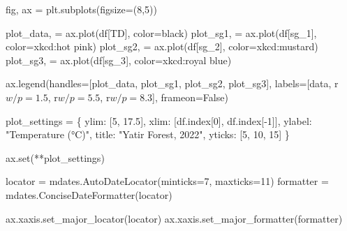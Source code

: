 \documentclass[
  letterpaper,
  DIV=11,
  numbers=noendperiod,
  oneside]{scrreprt}
\newenvironment{Shaded}{\begin{snugshade}}{\end{snugshade}}
\newcommand{\BuiltInTok}[1]{\textcolor[rgb]{0.00,0.23,0.31}{#1}}
\newcommand{\DecValTok}[1]{\textcolor[rgb]{0.68,0.00,0.00}{#1}}
\newcommand{\FloatTok}[1]{\textcolor[rgb]{0.68,0.00,0.00}{#1}}
\newcommand{\NormalTok}[1]{\textcolor[rgb]{0.00,0.23,0.31}{#1}}
\newcommand{\OperatorTok}[1]{\textcolor[rgb]{0.37,0.37,0.37}{#1}}
\newcommand{\StringTok}[1]{\textcolor[rgb]{0.13,0.47,0.30}{#1}}
\newcommand{\VariableTok}[1]{\textcolor[rgb]{0.07,0.07,0.07}{#1}}
\newcommand{\VerbatimStringTok}[1]{\textcolor[rgb]{0.13,0.47,0.30}{#1}}
\begin{document}
\begin{Shaded}
\begin{Highlighting}[]
\NormalTok{fig, ax }\OperatorTok{=}\NormalTok{ plt.subplots(figsize}\OperatorTok{=}\NormalTok{(}\DecValTok{8}\NormalTok{,}\DecValTok{5}\NormalTok{))}

\NormalTok{plot\_data, }\OperatorTok{=}\NormalTok{ ax.plot(df[}\StringTok{\textquotesingle{}TD\textquotesingle{}}\NormalTok{], color}\OperatorTok{=}\StringTok{\textquotesingle{}black\textquotesingle{}}\NormalTok{)}
\NormalTok{plot\_sg1, }\OperatorTok{=}\NormalTok{ ax.plot(df[}\StringTok{\textquotesingle{}sg\_1\textquotesingle{}}\NormalTok{], color}\OperatorTok{=}\StringTok{\textquotesingle{}xkcd:hot pink\textquotesingle{}}\NormalTok{)}
\NormalTok{plot\_sg2, }\OperatorTok{=}\NormalTok{ ax.plot(df[}\StringTok{\textquotesingle{}sg\_2\textquotesingle{}}\NormalTok{], color}\OperatorTok{=}\StringTok{\textquotesingle{}xkcd:mustard\textquotesingle{}}\NormalTok{)}
\NormalTok{plot\_sg3, }\OperatorTok{=}\NormalTok{ ax.plot(df[}\StringTok{\textquotesingle{}sg\_3\textquotesingle{}}\NormalTok{], color}\OperatorTok{=}\StringTok{\textquotesingle{}xkcd:royal blue\textquotesingle{}}\NormalTok{)}

\NormalTok{ax.legend(handles}\OperatorTok{=}\NormalTok{[plot\_data, plot\_sg1, plot\_sg2, plot\_sg3],}
\NormalTok{          labels}\OperatorTok{=}\NormalTok{[}\StringTok{\textquotesingle{}data\textquotesingle{}}\NormalTok{, }\VerbatimStringTok{r\textquotesingle{}$w/p=1.5$\textquotesingle{}}\NormalTok{, }\VerbatimStringTok{r\textquotesingle{}$w/p=5.5$\textquotesingle{}}\NormalTok{, }\VerbatimStringTok{r\textquotesingle{}$w/p=8.3$\textquotesingle{}}\NormalTok{],}
\NormalTok{          frameon}\OperatorTok{=}\VariableTok{False}\NormalTok{)}

\NormalTok{plot\_settings }\OperatorTok{=}\NormalTok{ \{}
    \StringTok{\textquotesingle{}ylim\textquotesingle{}}\NormalTok{: [}\DecValTok{5}\NormalTok{, }\FloatTok{17.5}\NormalTok{],}
    \StringTok{\textquotesingle{}xlim\textquotesingle{}}\NormalTok{: [df.index[}\DecValTok{0}\NormalTok{], df.index[}\OperatorTok{{-}}\DecValTok{1}\NormalTok{]],}
    \StringTok{\textquotesingle{}ylabel\textquotesingle{}}\NormalTok{: }\StringTok{"Temperature (°C)"}\NormalTok{,}
    \StringTok{\textquotesingle{}title\textquotesingle{}}\NormalTok{: }\StringTok{"Yatir Forest, 2022"}\NormalTok{,}
    \StringTok{\textquotesingle{}yticks\textquotesingle{}}\NormalTok{: [}\DecValTok{5}\NormalTok{, }\DecValTok{10}\NormalTok{, }\DecValTok{15}\NormalTok{]}
\NormalTok{\}}

\NormalTok{ax.}\BuiltInTok{set}\NormalTok{(}\OperatorTok{**}\NormalTok{plot\_settings)}

\NormalTok{locator }\OperatorTok{=}\NormalTok{ mdates.AutoDateLocator(minticks}\OperatorTok{=}\DecValTok{7}\NormalTok{, maxticks}\OperatorTok{=}\DecValTok{11}\NormalTok{)}
\NormalTok{formatter }\OperatorTok{=}\NormalTok{ mdates.ConciseDateFormatter(locator)}

\NormalTok{ax.xaxis.set\_major\_locator(locator)}
\NormalTok{ax.xaxis.set\_major\_formatter(formatter)}
\end{Highlighting}
\end{Shaded}
\end{document}
